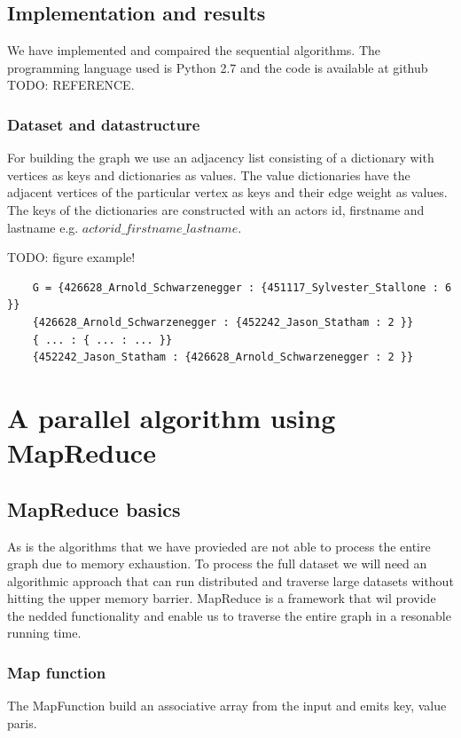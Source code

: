 \documentclass{article}
\begin{document}
\subsection{Implementation and results}
We have implemented and compaired the sequential algorithms. The programming language used is Python 2.7 and the code is available at github TODO: REFERENCE.

\subsubsection{Dataset and datastructure}
For building the graph we use an adjacency list consisting of a dictionary with vertices as keys and dictionaries as values. The value dictionaries have the adjacent vertices of the particular vertex as keys and their edge weight as values. The keys of the dictionaries are constructed with an actors id, firstname and lastname e.g. $actorid\_firstname\_lastname$.

TODO: figure example!
\lstset{numbers=left, language=Python, label=double dict}
\begin{lstlisting}
    G = {426628_Arnold_Schwarzenegger : {451117_Sylvester_Stallone : 6 }}
    {426628_Arnold_Schwarzenegger : {452242_Jason_Statham : 2 }}
    { ... : { ... : ... }}  
    {452242_Jason_Statham : {426628_Arnold_Schwarzenegger : 2 }}
\end{lstlisting}



\section{A parallel algorithm using MapReduce}

\subsection{MapReduce basics}
As is the algorithms that we have provieded are not able to process the entire graph due to memory exhaustion. To process the full dataset we will need an algorithmic approach that can run distributed and traverse large datasets without hitting the upper memory barrier. MapReduce is a framework that wil provide the nedded functionality and enable us to traverse the entire graph in a resonable running time.

\subsubsection{Map function}
The MapFunction build an associative array from the input and emits key, value paris.
\end{document}
